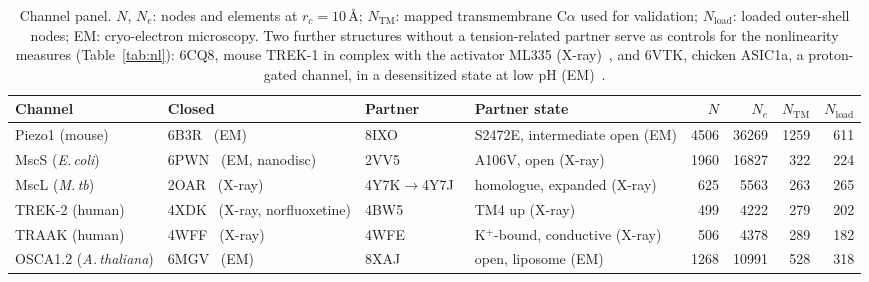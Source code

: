 \begin{table}[t]
\centering\small
\caption{Channel panel. $N$, $N_e$: nodes and elements at $r_c=10$\,\AA; $N_{\mathrm{TM}}$: mapped transmembrane C$\alpha$ used for validation; $N_{\mathrm{load}}$: loaded outer-shell nodes; EM: cryo-electron microscopy. Two further structures without a tension-related partner serve as controls for the nonlinearity measures (Table~\ref{tab:nl}): 6CQ8, mouse TREK-1 in complex with the activator ML335 (X-ray)~\citep{lolicato2017}, and 6VTK, chicken ASIC1a, a proton-gated channel, in a desensitized state at low pH (EM)~\citep{yoder2020}.}
\label{tab:panel}
\footnotesize\setlength{\tabcolsep}{3pt}
\begin{tabular}{@{}l>{\raggedright\arraybackslash}p{2.3cm}>{\raggedright\arraybackslash}p{2.1cm}>{\raggedright\arraybackslash}p{2.3cm}rrrr@{}}
\toprule
Channel & Closed & Partner & Partner state & $N$ & $N_e$ & $N_{\mathrm{TM}}$ & $N_{\mathrm{load}}$\\
\midrule
Piezo1 (mouse) & 6B3R~\citep{guo2017} (EM) & 8IXO~\citep{liu2025} & S2472E, intermediate open (EM) & 4506 & 36269 & 1259 & 611\\
MscS (\textit{E.\,coli}) & 6PWN~\citep{reddy2019} (EM, nanodisc) & 2VV5~\citep{wang2008} & A106V, open (X-ray) & 1960 & 16827 & 322 & 224\\
MscL (\textit{M.\,tb}) & 2OAR~\citep{steinbacher2007} (X-ray) & 4Y7K$\to$\allowbreak 4Y7J~\citep{li2015} & homologue, expanded (X-ray) & 625 & 5563 & 263 & 265\\
TREK-2 (human) & 4XDK~\citep{dong2015} (X-ray, norfluoxetine) & 4BW5~\citep{dong2015} & TM4 up (X-ray) & 499 & 4222 & 279 & 202\\
TRAAK (human) & 4WFF~\citep{brohawn2014} (X-ray) & 4WFE~\citep{brohawn2014} & K$^+$-bound, conductive (X-ray) & 506 & 4378 & 289 & 182\\
OSCA1.2 (\textit{A.\,thaliana}) & 6MGV~\citep{jojoacruz2018} (EM) & 8XAJ~\citep{han2024} & open, liposome (EM) & 1268 & 10991 & 528 & 318\\
\bottomrule
\end{tabular}
\end{table}
